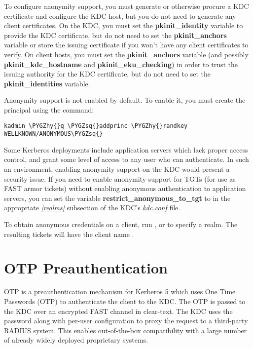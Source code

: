 \documentclass[letterpaper,10pt,english]{sphinxmanual}
\def\PYGZhy{\char`\-}
\def\PYGZsq{\char`\'}
\begin{document}
To configure anonymity support, you must generate or otherwise procure
a KDC certificate and configure the KDC host, but you do not need to
generate any client certificates.  On the KDC, you must set the
\textbf{pkinit\_identity} variable to provide the KDC certificate, but do
not need to set the \textbf{pkinit\_anchors} variable or store the issuing
certificate if you won't have any client certificates to verify.  On
client hosts, you must set the \textbf{pkinit\_anchors} variable (and
possibly \textbf{pkinit\_kdc\_hostname} and \textbf{pkinit\_eku\_checking}) in order
to trust the issuing authority for the KDC certificate, but do not
need to set the \textbf{pkinit\_identities} variable.

Anonymity support is not enabled by default.  To enable it, you must
create the principal  using the command:

\begin{Verbatim}[commandchars=\\\{\}]
kadmin \PYGZhy{}q \PYGZsq{}addprinc \PYGZhy{}randkey WELLKNOWN/ANONYMOUS\PYGZsq{}
\end{Verbatim}

Some Kerberos deployments include application servers which lack
proper access control, and grant some level of access to any user who
can authenticate.  In such an environment, enabling anonymity support
on the KDC would present a security issue.  If you need to enable
anonymity support for TGTs (for use as FAST armor tickets) without
enabling anonymous authentication to application servers, you can set
the variable \textbf{restrict\_anonymous\_to\_tgt} to  in the
appropriate {\hyperref[admin/conf_files/kdc_conf:kdc-realms]{\emph{{[}realms{]}}}} subsection of the KDC's
{\hyperref[admin/conf_files/kdc_conf:kdc-conf-5]{\emph{kdc.conf}}} file.

To obtain anonymous credentials on a client, run , or
 to specify a realm.  The resulting tickets
will have the client name .


\chapter{OTP Preauthentication}
\label{admin/otp::doc}\label{admin/otp:otp-preauthentication}\label{admin/otp:otp-preauth}
OTP is a preauthentication mechanism for Kerberos 5 which uses One
Time Passwords (OTP) to authenticate the client to the KDC.  The OTP
is passed to the KDC over an encrypted FAST channel in clear-text.
The KDC uses the password along with per-user configuration to proxy
the request to a third-party RADIUS system.  This enables
out-of-the-box compatibility with a large number of already widely
deployed proprietary systems.
\end{document}
